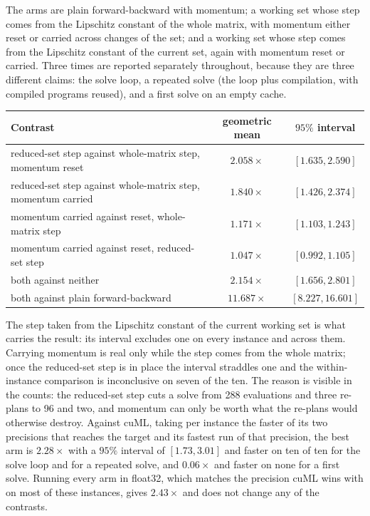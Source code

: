 \documentclass[11pt]{article}
\begin{document}
The arms are plain forward-backward with momentum; a working set whose step
comes from the Lipschitz constant of the whole matrix, with momentum either
reset or carried across changes of the set; and a working set whose step comes
from the Lipschitz constant of the current set, again with momentum reset or
carried. Three times are reported separately throughout, because they are
three different claims: the solve loop, a repeated solve (the loop plus
compilation, with compiled programs reused), and a first solve on an empty
cache.

\begin{center}
\small
\begin{tabular}{lcc}
\toprule
Contrast & geometric mean & $95\%$ interval \\
\midrule
reduced-set step against whole-matrix step, momentum reset & $2.058\times$ & $[1.635, 2.590]$ \\
reduced-set step against whole-matrix step, momentum carried & $1.840\times$ & $[1.426, 2.374]$ \\
momentum carried against reset, whole-matrix step & $1.171\times$ & $[1.103, 1.243]$ \\
momentum carried against reset, reduced-set step & $1.047\times$ & $[0.992, 1.105]$ \\
both against neither & $2.154\times$ & $[1.656, 2.801]$ \\
both against plain forward-backward & $11.687\times$ & $[8.227, 16.601]$ \\
\bottomrule
\end{tabular}
\end{center}

The step taken from the Lipschitz constant of the current working set is what
carries the result: its interval excludes one on every instance and across
them. Carrying momentum is real only while the step comes from the whole
matrix; once the reduced-set step is in place the interval straddles one and
the within-instance comparison is inconclusive on seven of the ten. The reason
is visible in the counts: the reduced-set step cuts a solve from 288
evaluations and three re-plans to 96 and two, and momentum can only be worth
what the re-plans would otherwise destroy. Against cuML, taking per instance
the faster of its two precisions that reaches the target and its fastest run of
that precision, the best arm is $2.28\times$ with a $95\%$ interval of $[1.73,
3.01]$ and faster on ten of ten for the solve loop and for a repeated solve,
and $0.06\times$ and faster on none for a first solve. Running every arm in
float32, which matches the precision cuML wins with on most of these
instances, gives $2.43\times$ and does not change any of the contrasts.
\end{document}
